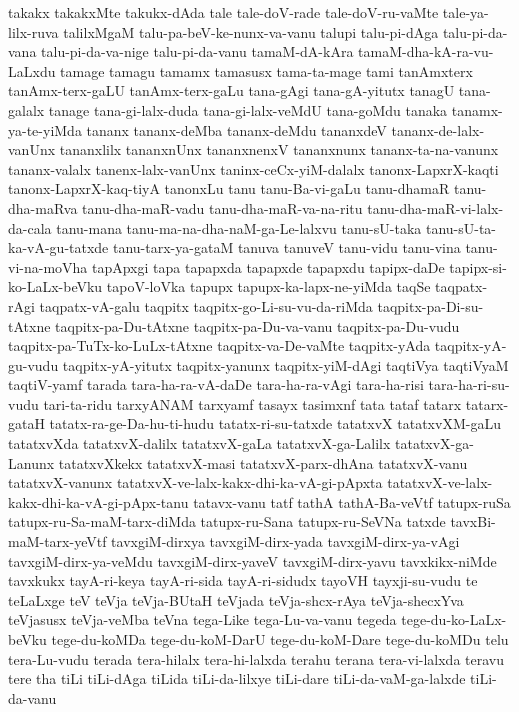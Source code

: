 {takakx
takakxMte
takukx-dAda
tale
tale-doV-rade
tale-doV-ru-vaMte
tale-ya-lilx-ruva
talilxMgaM
talu-pa-beV-ke-nunx-va-vanu
talupi
talu-pi-dAga
talu-pi-da-vana
talu-pi-da-va-nige
talu-pi-da-vanu
tamaM-dA-kAra
tamaM-dha-kA-ra-vu-LaLxdu
tamage
tamagu
tamamx
tamasusx
tama-ta-mage
tami
tanAmxterx
tanAmx-terx-gaLU
tanAmx-terx-gaLu
tana-gAgi
tana-gA-yitutx
tanagU
tana-galalx
tanage
tana-gi-lalx-duda
tana-gi-lalx-veMdU
tana-goMdu
tanaka
tanamx-ya-te-yiMda
tananx
tananx-deMba
tananx-deMdu
tananxdeV
tananx-de-lalx-vanUnx
tananxlilx
tananxnUnx
tananxnenxV
tananxnunx
tananx-ta-na-vanunx
tananx-valalx
tanenx-lalx-vanUnx
taninx-ceCx-yiM-dalalx
tanonx-LapxrX-kaqti
tanonx-LapxrX-kaq-tiyA
tanonxLu
tanu
tanu-Ba-vi-gaLu
tanu-dhamaR
tanu-dha-maRva
tanu-dha-maR-vadu
tanu-dha-maR-va-na-ritu
tanu-dha-maR-vi-lalx-da-cala
tanu-mana
tanu-ma-na-dha-naM-ga-Le-lalxvu
tanu-sU-taka
tanu-sU-ta-ka-vA-gu-tatxde
tanu-tarx-ya-gataM
tanuva
tanuveV
tanu-vidu
tanu-vina
tanu-vi-na-moVha
tapApxgi
tapa
tapapxda
tapapxde
tapapxdu
tapipx-daDe
tapipx-si-ko-LaLx-beVku
tapoV-loVka
tapupx
tapupx-ka-lapx-ne-yiMda
taqSe
taqpatx-rAgi
taqpatx-vA-galu
taqpitx
taqpitx-go-Li-su-vu-da-riMda
taqpitx-pa-Di-su-tAtxne
taqpitx-pa-Du-tAtxne
taqpitx-pa-Du-va-vanu
taqpitx-pa-Du-vudu
taqpitx-pa-TuTx-ko-LuLx-tAtxne
taqpitx-va-De-vaMte
taqpitx-yAda
taqpitx-yA-gu-vudu
taqpitx-yA-yitutx
taqpitx-yanunx
taqpitx-yiM-dAgi
taqtiVya
taqtiVyaM
taqtiV-yamf
tarada
tara-ha-ra-vA-daDe
tara-ha-ra-vAgi
tara-ha-risi
tara-ha-ri-su-vudu
tari-ta-ridu
tarxyANAM
tarxyamf
tasayx
tasimxnf
tata
tataf
tatarx
tatarx-gataH
tatatx-ra-ge-Da-hu-ti-hudu
tatatx-ri-su-tatxde
tatatxvX
tatatxvXM-gaLu
tatatxvXda
tatatxvX-dalilx
tatatxvX-gaLa
tatatxvX-ga-Lalilx
tatatxvX-ga-Lanunx
tatatxvXkekx
tatatxvX-masi
tatatxvX-parx-dhAna
tatatxvX-vanu
tatatxvX-vanunx
tatatxvX-ve-lalx-kakx-dhi-ka-vA-gi-pApxta
tatatxvX-ve-lalx-kakx-dhi-ka-vA-gi-pApx-tanu
tatavx-vanu
tatf
tathA
tathA-Ba-veVtf
tatupx-ruSa
tatupx-ru-Sa-maM-tarx-diMda
tatupx-ru-Sana
tatupx-ru-SeVNa
tatxde
tavxBi-maM-tarx-yeVtf
tavxgiM-dirxya
tavxgiM-dirx-yada
tavxgiM-dirx-ya-vAgi
tavxgiM-dirx-ya-veMdu
tavxgiM-dirx-yaveV
tavxgiM-dirx-yavu
tavxkikx-niMde
tavxkukx
tayA-ri-keya
tayA-ri-sida
tayA-ri-sidudx
tayoVH
tayxji-su-vudu
te
teLaLxge
teV
teVja
teVja-BUtaH
teVjada
teVja-shcx-rAya
teVja-shecxYva
teVjasusx
teVja-veMba
teVna
tega-Like
tega-Lu-va-vanu
tegeda
tege-du-ko-LaLx-beVku
tege-du-koMDa
tege-du-koM-DarU
tege-du-koM-Dare
tege-du-koMDu
telu
tera-Lu-vudu
terada
tera-hilalx
tera-hi-lalxda
terahu
terana
tera-vi-lalxda
teravu
tere
tha
tiLi
tiLi-dAga
tiLida
tiLi-da-lilxye
tiLi-dare
tiLi-da-vaM-ga-lalxde
tiLi-da-vanu
}
